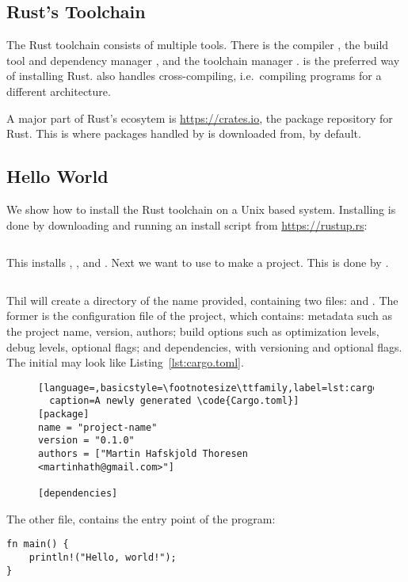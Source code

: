 \documentclass[b5paper,twoside]{report}
\begin{document}
\begin{appendices}
  \chapter{Rust's Toolchain}
  The Rust toolchain consists of multiple tools.
  There is the compiler \rustc{}, the build tool and dependency manager \cargo{},
  and the toolchain manager \rustup.
  \rustup{} is the preferred way of installing Rust.
  \rustup{} also handles cross-compiling, i.e.\ compiling programs for a different
  architecture.

  A major part of Rust's ecosytem is \url{https://crates.io}, the package repository
  for Rust. This is where packages handled by \cargo{} is downloaded from, by default.

  \section*{Hello World}
  We show how to install the Rust toolchain on a Unix based system.
  Installing \rustup{} is done by downloading and running an install script from
  \url{https://rustup.rs}:
  \begin{lstlisting}[language=Bash,numbers=none]
% curl https://sh.rustup.rs -sSf | sh
  \end{lstlisting}
  This installs \rustup{}, \cargo{}, and \rustc{}.
  Next we want to use \cargo{} to make a project. This is done by .
  \begin{lstlisting}[language=Bash,numbers=none]
% cargo init --bin <name-of-project>
  \end{lstlisting}
  Thil will create a directory of the name provided, containing two files:
   and .
  The former is the configuration file of the project, which contains:
  metadata such as the project name, version, authors;
  build options such as optimization levels, debug levels, optional flags;
  and dependencies, with versioning and optional flags.
  The initial  may look like Listing~\ref{lst:cargo.toml}.
  \begin{figure}[ht]
  \begin{lstlisting}[language=,basicstyle=\footnotesize\ttfamily,label=lst:cargo.toml,
  caption=A newly generated \code{Cargo.toml}]
[package]
name = "project-name"
version = "0.1.0"
authors = ["Martin Hafskjold Thoresen <martinhath@gmail.com>"]

[dependencies]
  \end{lstlisting}
\end{figure}
  The other file,  contains the entry point of the program:
  \begin{lstlisting}
fn main() {
    println!("Hello, world!");
}
  \end{lstlisting}


\end{appendices}
\end{document}
